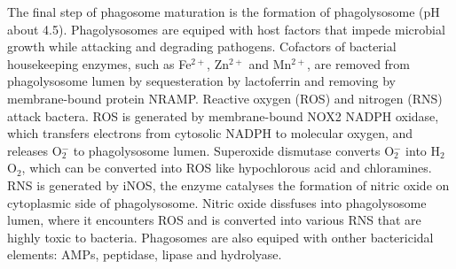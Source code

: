 \documentclass[11pt]{article}
\begin{document}
\newline

The final step of phagosome maturation is the formation of phagolysosome (pH about 4.5). 
Phagolysosomes are equiped with host factors that impede microbial growth while attacking and degrading pathogens. 
Cofactors of bacterial housekeeping enzymes, such as Fe$^{2+}$, Zn$^{2+}$ and Mn$^{2+}$, are removed from phagolysosome lumen by sequesteration by lactoferrin and removing by membrane-bound protein NRAMP. 
Reactive oxygen (ROS) and nitrogen (RNS) attack bactera. 
ROS is generated by membrane-bound NOX2 NADPH oxidase, which transfers electrons from cytosolic NADPH to molecular oxygen, and releases O$_2^{-}$ to phagolysosome lumen. 
Superoxide dismutase converts O$_2^{-}$ into H$_2$O$_2$, which can be converted into ROS like hypochlorous acid and chloramines. 
RNS is generated by iNOS, the enzyme catalyses the formation of nitric oxide on cytoplasmic side of phagolysosome. 
Nitric oxide dissfuses into phagolysosome lumen, where it encounters ROS and is converted into various RNS that are highly toxic to bacteria. 
Phagosomes are also equiped with onther bactericidal elements: AMPs, peptidase, lipase and hydrolyase.
\end{document}
